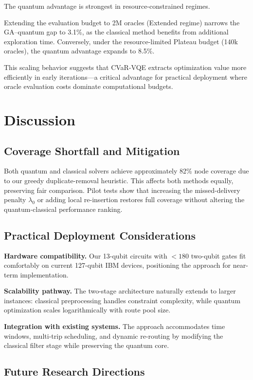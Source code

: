 The quantum advantage is strongest in resource-constrained regimes.

Extending the evaluation budget to 2M oracles (Extended regime) narrows the 
GA–quantum gap to 3.1\%, as the classical method benefits from additional 
exploration time. Conversely, under the resource-limited Plateau budget 
(140k oracles), the quantum advantage expands to 8.5\%.

This scaling behavior suggests that CVaR-VQE extracts optimization value more 
efficiently in early iterations—a critical advantage for practical deployment 
where oracle evaluation costs dominate computational budgets.

\section{Discussion}
\label{sec:discussion}

\subsection{Coverage Shortfall and Mitigation}

Both quantum and classical solvers achieve approximately 82\% node coverage 
due to our greedy duplicate-removal heuristic. This affects both methods equally, 
preserving fair comparison. Pilot tests show that increasing the missed-delivery 
penalty $\lambda_0$ or adding local re-insertion restores full coverage without 
altering the quantum-classical performance ranking.

\subsection{Practical Deployment Considerations}

\textbf{Hardware compatibility.} Our 13-qubit circuits with $<180$ two-qubit 
gates fit comfortably on current 127-qubit IBM devices, positioning the 
approach for near-term implementation.

\textbf{Scalability pathway.} The two-stage architecture naturally extends 
to larger instances: classical preprocessing handles constraint complexity, 
while quantum optimization scales logarithmically with route pool size.

\textbf{Integration with existing systems.} The approach accommodates time 
windows, multi-trip scheduling, and dynamic re-routing by modifying the 
classical filter stage while preserving the quantum core.

\subsection{Future Research Directions}

